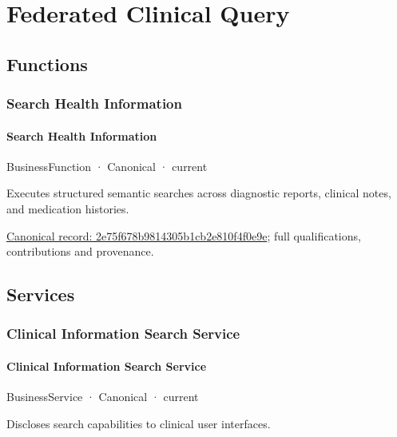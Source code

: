 \section{Federated Clinical Query}

\subsection{Functions}

\subsubsection{Search Health Information}

\paragraph{Search Health Information}

\label{element:2e75f678b9814305b1cb2e810f4f0e9e}
{\small BusinessFunction · Canonical · current}\par

Executes structured semantic searches across diagnostic reports, clinical notes, and medication histories.


{\footnotesize \href{../../../../continuum/business/business-function/2e75f678b9814305b1cb2e810f4f0e9e.md}{Canonical record: 2e75f678b9814305b1cb2e810f4f0e9e}; full qualifications, contributions and provenance.}\par
\subsection{Services}

\subsubsection{Clinical Information Search Service}

\paragraph{Clinical Information Search Service}

\label{element:ef87ad2b419443a9989849bf18dfb385}
{\small BusinessService · Canonical · current}\par

Discloses search capabilities to clinical user interfaces.


